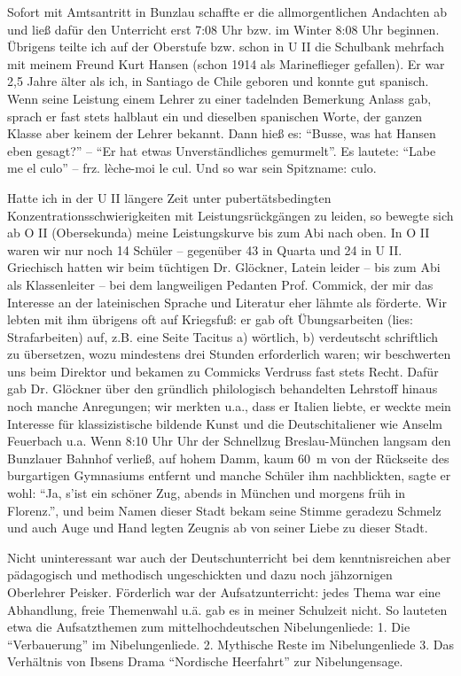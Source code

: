Sofort mit Amtsantritt in Bunzlau schaffte er die allmorgentlichen Andachten ab und ließ dafür den Unterricht erst 7:08 Uhr bzw. im Winter 8:08 Uhr beginnen. Übrigens teilte ich auf der Oberstufe bzw. schon in U II die Schulbank mehrfach mit meinem Freund Kurt Hansen (schon 1914 als Marineflieger gefallen). Er war 2,5 Jahre älter als ich, in Santiago de Chile geboren und konnte gut spanisch. Wenn seine Leistung einem Lehrer zu einer tadelnden Bemerkung Anlass gab, sprach er fast stets halblaut ein und dieselben spanischen Worte, der ganzen Klasse aber keinem der Lehrer bekannt. Dann hieß es: \enquote{Busse, was hat Hansen eben gesagt?} -- \enquote{Er hat etwas Unverständliches gemurmelt}. Es lautete: \enquote{Labe me el culo} -- frz. lèche-moi le cul. Und so war sein Spitzname: culo.

Hatte ich in der U II längere Zeit unter pubertätsbedingten Konzentrationsschwierigkeiten mit Leistungsrückgängen zu leiden, so bewegte sich ab O II (Obersekunda) meine Leistungskurve bis zum Abi nach oben. In O II waren wir nur noch 14 Schüler -- gegenüber 43 in Quarta und 24 in U II. Griechisch hatten wir beim tüchtigen Dr. Glöckner, Latein leider -- bis zum Abi als Klassenleiter -- bei dem langweiligen Pedanten Prof. Commick, der mir das Interesse an der lateinischen Sprache und Literatur eher lähmte als förderte. Wir lebten mit ihm übrigens oft auf Kriegsfuß: er gab oft Übungsarbeiten (lies: Strafarbeiten) auf, z.B. eine Seite Tacitus a) wörtlich, b) verdeutscht schriftlich zu übersetzen, wozu mindestens drei Stunden erforderlich waren; wir beschwerten uns beim Direktor und bekamen zu Commicks Verdruss fast stets Recht. Dafür gab Dr. Glöckner über den gründlich philologisch behandelten Lehrstoff hinaus noch manche Anregungen; wir merkten u.a., dass er Italien liebte, er weckte mein Interesse für klassizistische bildende Kunst und die Deutschitaliener wie Anselm Feuerbach u.a. Wenn 8:10 Uhr Uhr der Schnellzug Breslau-München langsam den Bunzlauer Bahnhof verließ, auf hohem Damm, kaum 60~m von der Rückseite des burgartigen Gymnasiums entfernt und manche Schüler ihm nachblickten, sagte er wohl: \enquote{Ja, s'ist ein schöner Zug, abends in München und morgens früh in Florenz.}, und beim Namen dieser Stadt bekam seine Stimme geradezu Schmelz und auch Auge und Hand legten Zeugnis ab von seiner Liebe zu dieser Stadt.

Nicht uninteressant war auch der Deutschunterricht bei dem kenntnisreichen aber pädagogisch und methodisch ungeschickten und dazu noch jähzornigen Oberlehrer Peisker. Förderlich war der Aufsatzunterricht: jedes Thema war eine Abhandlung, freie Themenwahl u.ä. gab es in meiner Schulzeit nicht. So lauteten etwa die Aufsatzthemen zum mittelhochdeutschen Nibelungenliede: 1. Die \enquote{Verbauerung} im Nibelungenliede. 2. Mythische Reste im Nibelungenliede 3. Das Verhältnis von Ibsens Drama \enquote{Nordische Heerfahrt} zur Nibelungensage.

